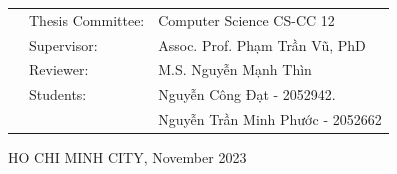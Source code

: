 \documentclass[16pt]{report}
\begin{document}
\begin{titlepage}
\vspace{1cm}


\begin{table}[h]
\begin{tabular}{rll}
\hspace{3 cm}
& Thesis Committee: &Computer Science CS-CC 12\\
& Supervisor: &Assoc. Prof. Phạm Trần Vũ, PhD\\
& Reviewer: &M.S. Nguyễn Mạnh Thìn \\
& Students: & Nguyễn Công Đạt - 2052942. \\
& & Nguyễn Trần Minh Phước - 2052662\\
\end{tabular}
\end{table}


\begin{center}
{\footnotesize HO CHI MINH CITY, November 2023}
\end{center}
\end{titlepage}






\afterpreface







% 

\renewcommand{\bibname}{References}

\printbibliography
\appendix
% 
% 
\end{document}
